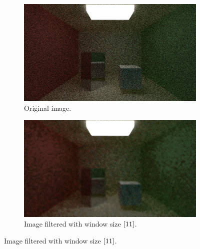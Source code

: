 \documentclass[titlepage,12pt]{report}
\begin{document}
\begin{figure}[H]
	\centering
	\begin{subfigure}{.48\textwidth}
		\centering
		\includegraphics[scale=0.2]{media/cornell_normal_10.png}
		\caption{Original image.}
		\label{median_filter_1}
	\end{subfigure}
	\begin{subfigure}{.48\textwidth}
		\centering
		\includegraphics[scale=0.2]{media/median/cornell_normal_10_median_filter_11.png}
		\caption{Image filtered with window size $[11 \time 11]$.}
		\label{median_filter_2}
	\end{subfigure}


\end{figure}
\end{document}
